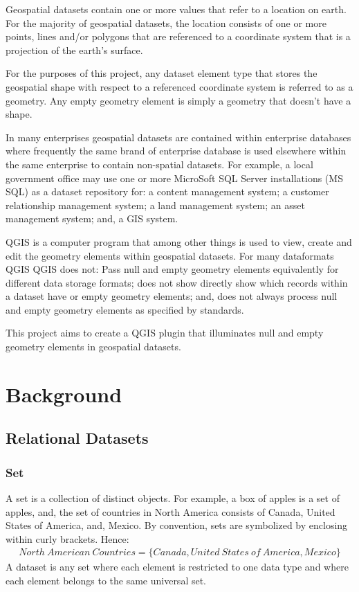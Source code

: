 \documentclass[letterpaper,10pt,english]{sphinxmanual}
\begin{document}
Geospatial datasets contain one or more values that refer to a location on earth.  For the majority of geospatial
datasets, the location consists of one or more points, lines and/or polygons that are referenced to a coordinate system
that is a projection of the earth’s surface.

For the purposes of this project, any dataset element type that stores the geospatial shape with respect to a referenced coordinate system is referred to as a geometry.  Any empty geometry element is simply a geometry that doesn’t have a shape.

In many enterprises geospatial datasets are contained within enterprise databases where frequently the same brand of enterprise database is used elsewhere within the same enterprise to contain non-spatial datasets.  For example, a local government office may use one or more MicroSoft SQL Server installations (MS SQL) as a dataset repository for: a content management system; a customer relationship management system; a land management system; an asset management system; and, a GIS system.

QGIS  is a computer program that among other things is used to view, create and edit the geometry elements within geospatial datasets.  For many dataformats QGIS  QGIS does not: Pass null and empty geometry elements equivalently for different data storage formats; does not show directly show which records within a dataset have  or empty geometry elements; and, does not always process null and empty geometry elements as specified by standards.

This project aims to create a QGIS plugin that illuminates null and empty geometry elements in geospatial datasets.


\section{Background}
\label{\detokenize{concept:background}}

\subsection{Relational Datasets}
\label{\detokenize{concept:relational-datasets}}

\subsubsection{Set}
\label{\detokenize{concept:set}}
A set is a collection of distinct objects.  For example, a box of apples is a set of apples, and, the set of countries in North America consists of Canada,  United States of America, and, Mexico.  By convention, sets are symbolized by enclosing within curly brackets.  Hence:
\begin{equation*}
\begin{split}North\ American\ Countries = \{Canada, United\ States\ of\ America, Mexico\}\end{split}
\end{equation*}
A dataset is any set where each element is restricted to one data type and where each element belongs to the same universal set.
\end{document}
